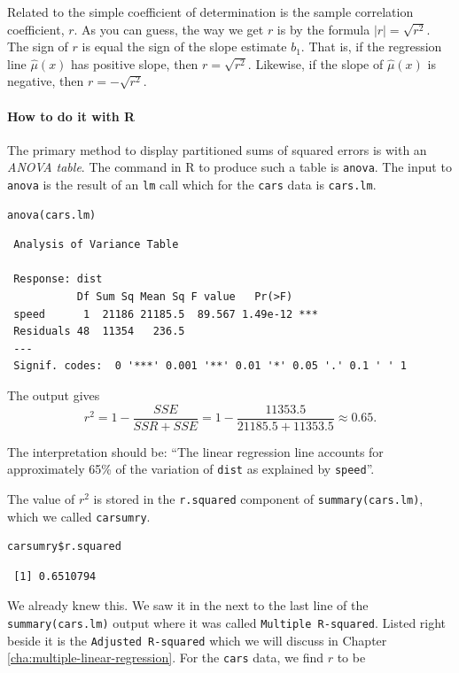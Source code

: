 \documentclass[captions=tableheading]{scrbook}
\begin{document}
Related to the simple coefficient of determination is the sample correlation coefficient, \(r\). As you can guess, the way we get \(r\) is by the formula \(|r|=\sqrt{r^{2}}\). The sign of \(r\) is equal the sign of the slope estimate \(b_{1}\). That is, if the regression line \(\hat{\mu}(x)\) has positive slope, then \(r=\sqrt{r^{2}}\). Likewise, if the slope of \(\hat{\mu}(x)\) is negative, then \(r=-\sqrt{r^{2}}\).


\paragraph*{How to do it with \textsf{R}}

The primary method to display partitioned sums of squared errors is with an \emph{ANOVA table}. The command in \textsf{R} to produce such a table is \texttt{anova}. The input to \texttt{anova} is the result of an \texttt{lm} call which for the \texttt{cars} data is \texttt{cars.lm}.


\begin{verbatim}
anova(cars.lm)
\end{verbatim}

\begin{verbatim}
 Analysis of Variance Table
 
 Response: dist
           Df Sum Sq Mean Sq F value   Pr(>F)    
 speed      1  21186 21185.5  89.567 1.49e-12 ***
 Residuals 48  11354   236.5                     
 ---
 Signif. codes:  0 '***' 0.001 '**' 0.01 '*' 0.05 '.' 0.1 ' ' 1
\end{verbatim}

The output gives
\[
r^{2}=1-\frac{SSE}{SSR+SSE}=1-\frac{11353.5}{21185.5+11353.5}\approx0.65.
\]

The interpretation should be: ``The linear regression line accounts for approximately 65\% of the variation of \texttt{dist} as explained by \texttt{speed}''.

The value of \(r^{2}\) is stored in the \texttt{r.squared} component of \texttt{summary(cars.lm)}, which we called \texttt{carsumry}.


\begin{verbatim}
carsumry$r.squared
\end{verbatim}

\begin{verbatim}
 [1] 0.6510794
\end{verbatim}

We already knew this. We saw it in the next to the last line of the \texttt{summary(cars.lm)} output where it was called \texttt{Multiple R-squared}. Listed right beside it is the \texttt{Adjusted R-squared} which we will discuss in Chapter \ref{cha:multiple-linear-regression}.  For the \texttt{cars} data, we find \(r\) to be
\end{document}
